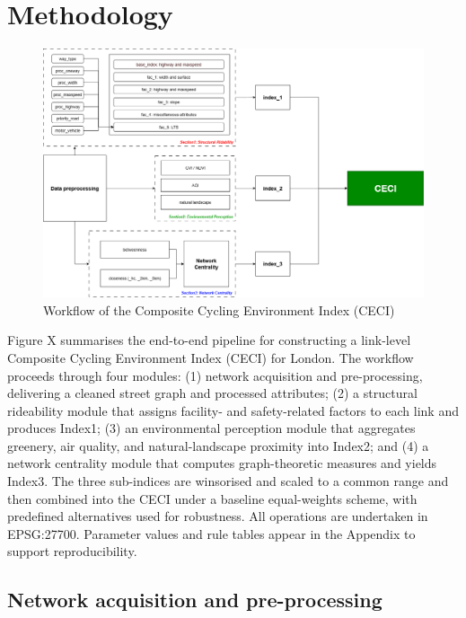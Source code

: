 \documentclass[
  12pt,
  oneside]{book}
\begin{document}
\chapter{Methodology}\label{methodology}

\begin{figure}

{\centering \includegraphics[width=1\linewidth]{general_images/flow} 

}

\caption{Workflow of the Composite Cycling Environment Index (CECI)}\label{fig:flow}
\end{figure}

Figure X summarises the end-to-end pipeline for constructing a link-level Composite Cycling Environment Index (CECI) for London. The workflow proceeds through four modules: (1) network acquisition and pre-processing, delivering a cleaned street graph and processed attributes; (2) a structural rideability module that assigns facility- and safety-related factors to each link and produces Index1; (3) an environmental perception module that aggregates greenery, air quality, and natural-landscape proximity into Index2; and (4) a network centrality module that computes graph-theoretic measures and yields Index3. The three sub-indices are winsorised and scaled to a common range and then combined into the CECI under a baseline equal-weights scheme, with predefined alternatives used for robustness. All operations are undertaken in EPSG:27700. Parameter values and rule tables appear in the Appendix to support reproducibility.

\section{Network acquisition and pre-processing}\label{network-acquisition-and-pre-processing}
\end{document}
